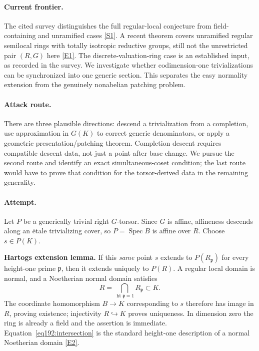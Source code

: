 \documentclass[11pt,a4paper]{article}
\newcommand{\sref}[2]{\hyperlink{source:#1:#2}{[S#2]}}
\newcommand{\eref}[2]{\hyperlink{extra:#1:#2}{[E#2]}}
\numberwithin{equation}{section}
\begin{document}
\paragraph{Current frontier.}
The cited survey distinguishes the full regular-local conjecture from field-containing and unramified cases \sref{statement}{1}. A recent theorem covers unramified regular semilocal rings with totally isotropic reductive groups, still not the unrestricted pair $(R,G)$ here \eref{statement}{1}. The discrete-valuation-ring case is an established input, as recorded in the survey. We investigate whether codimension-one trivializations can be synchronized into one generic section. This separates the easy normality extension from the genuinely nonabelian patching problem.

\paragraph{Attack route.}
There are three plausible directions: descend a trivialization from a completion, use approximation in $G(K)$ to correct generic denominators, or apply a geometric presentation/patching theorem. Completion descent requires compatible descent data, not just a point after base change. We pursue the second route and identify an exact simultaneous-coset condition; the last route would have to prove that condition for the torsor-derived data in the remaining generality.

\paragraph{Attempt.}
Let $P$ be a generically trivial right $G$-torsor. Since $G$ is affine, affineness descends along an \"etale trivializing cover, so $P=\operatorname{Spec}B$ is affine over $R$. Choose $s\in P(K)$.

\textbf{Hartogs extension lemma.} If this \emph{same} point $s$ extends to $P(R_{\mathfrak p})$ for every height-one prime $\mathfrak p$, then it extends uniquely to $P(R)$.
A regular local domain is normal, and a Noetherian normal domain satisfies
\begin{equation}\label{eq192:intersection}
 R=\bigcap_{\operatorname{ht}\mathfrak p=1}R_{\mathfrak p}\subset K.
\end{equation}
The coordinate homomorphism $B\to K$ corresponding to $s$ therefore has image in $R$, proving existence; injectivity $R\hookrightarrow K$ proves uniqueness. In dimension zero the ring is already a field and the assertion is immediate. Equation~\eqref{eq192:intersection} is the standard height-one description of a normal Noetherian domain \eref{statement}{2}.
\end{document}
